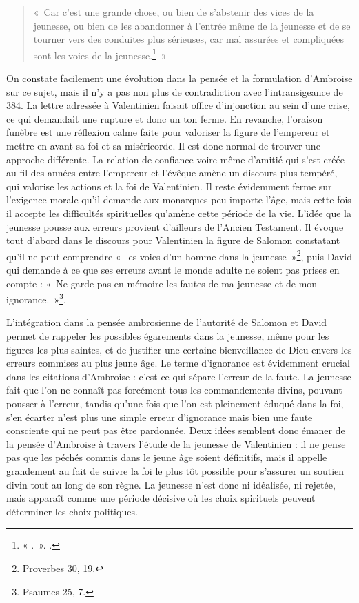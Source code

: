 \bigskip

\begin{quote}
«~Car c’est une grande chose, ou bien de s’abstenir des vices de la jeunesse, ou bien de les abandonner à l’entrée même de la jeunesse et de se tourner vers des conduites plus sérieuses, car mal assurées et compliquées sont les voies de la jeunesse.\footnote{« .~». \cite[]{ambroise_mort_valentinien}.}~»
\end{quote}

\bigskip

On constate facilement une évolution dans la pensée et la formulation d'Ambroise sur ce sujet, mais il n'y a pas non plus de contradiction avec l'intransigeance de 384. La lettre adressée à Valentinien faisait office d'injonction au sein d'une crise, ce qui demandait une rupture et donc un ton ferme. En revanche, l'oraison funèbre est une réflexion calme faite pour valoriser la figure de l'empereur et mettre en avant sa foi et sa miséricorde. Il est donc normal de trouver une approche différente. La relation de confiance voire même d’amitié qui s’est créée au fil des années entre l’empereur et l’évêque amène un discours plus tempéré, qui valorise les actions et la foi de Valentinien. Il reste évidemment ferme sur l’exigence morale qu’il demande aux monarques peu importe l’âge, mais cette fois il accepte les difficultés spirituelles qu’amène cette période de la vie. L'idée que la jeunesse pousse aux erreurs provient d'ailleurs de l'Ancien Testament. Il évoque tout d'abord dans le discours pour Valentinien la figure de Salomon constatant qu'il ne peut comprendre «~les voies d’un homme dans la jeunesse~»\footnote{Proverbes 30, 19.}, puis David qui demande à ce que ses erreurs avant le monde adulte ne soient pas prises en compte : «~Ne garde pas en mémoire les fautes de ma jeunesse et de mon ignorance.~»\footnote{Psaumes 25, 7.}.

\bigskip

L’intégration dans la pensée ambrosienne de l’autorité de Salomon et David permet de rappeler les possibles égarements dans la jeunesse, même pour les figures les plus saintes, et de justifier une certaine bienveillance de Dieu envers les erreurs commises au plus jeune âge. Le terme d’ignorance est évidemment crucial dans les citations d’Ambroise : c’est ce qui sépare l’erreur de la faute. La jeunesse fait que l’on ne connaît pas forcément tous les commandements divins, pouvant pousser à l’erreur, tandis qu’une fois que l’on est pleinement éduqué dans la foi, s’en écarter n’est plus une simple erreur d’ignorance mais bien une faute consciente qui ne peut pas être pardonnée. Deux idées semblent donc émaner de la pensée d’Ambroise à travers l’étude de la jeunesse de Valentinien : il ne pense pas que les péchés commis dans le jeune âge soient définitifs, mais il appelle grandement au fait de suivre la foi le plus tôt possible pour s’assurer un soutien divin tout au long de son règne. La jeunesse n’est donc ni idéalisée, ni rejetée, mais apparaît comme une période décisive où les choix spirituels peuvent déterminer les choix politiques.

